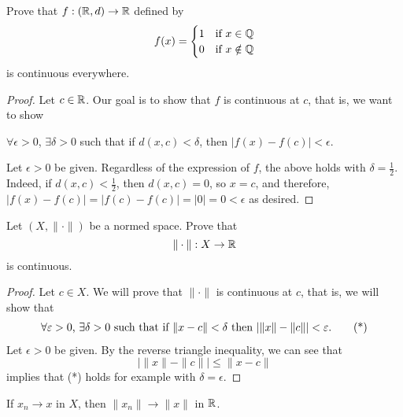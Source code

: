 \documentclass[a4paper]{article}
\begin{document}
\begin{eg}
    Prove that \( f: (\R,d) \to \R  \) defined by 
    \[  f(x) = 
    \begin{cases}
        1 &\text{if} \ x \in \Q \\
        0 &\text{if} \ x \notin \Q
    \end{cases} \]
    is continuous everywhere.
\end{eg}
\begin{proof}
Let \( c \in \R  \). Our goal is to show that \( f  \) is continuous at \( c  \), that is, we want to show 
\begin{center}
    \( \forall \epsilon > 0  \), \( \exists \delta > 0  \) such that if \( d(x,c) < \delta \), then \( | f(x) - f(c) | < \epsilon \). 
\end{center}
Let \( \epsilon > 0  \) be given. Regardless of the expression of \( f  \), the above holds with \( \delta = \frac{ 1 }{ 2 }  \). Indeed, if \( d(x,c) < \frac{ 1 }{ 2 }  \), then \( d(x,c) = 0  \), so \( x = c  \), and therefore, \( | f(x) - f(c) |  =  | f(c) - f(c) |  = | 0 | = 0 < \epsilon \) as desired.
\end{proof}

\begin{eg}
    Let \( (X, \|\cdot\|) \) be a normed space. Prove that 
    \[  \|\cdot\| : X \to \R  \]
    is continuous.
\end{eg}
\begin{proof}
Let \( c \in X  \). We will prove that \( \|\cdot\| \) is continuous at \( c  \), that is, we will show that  
\begin{align*}
    \text{\( \forall \epsilon > 0  \), \( \exists \delta > 0  \) such that if \( \|x - c \| < \delta \) then \( | \|x \| - \|c\| |  < \epsilon \)}. \tag{*}
\end{align*}
Let \( \epsilon > 0  \) be given. By the reverse triangle inequality, we can see that 
\[ \Big| \|x\| - \|c\| \Big| \leq \|x - c\|  \]
implies that (*) holds for example with \( \delta = \epsilon \).
\end{proof}
\begin{corollary}
    If \( {x}_{n} \to x  \) in \( X  \), then \( \|{x}_{n}\| \to \|x\|  \) in \( \R  \).
\end{corollary}
\end{document}
